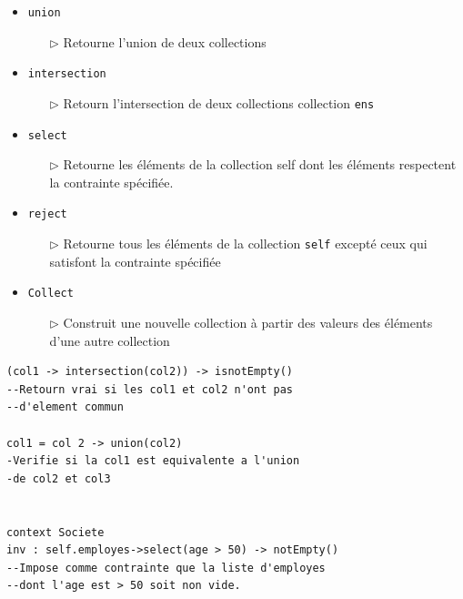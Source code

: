 \documentclass[16pt]{report}
\begin{document}
\begin{multicols*}{2}
  \begin{itemize}
            \item \textcolor{myb}{\texttt{union}}    
            \begin{itemize}
                \item[$\rhd$] Retourne l'union de deux collections 
            \end{itemize}
        \item \textcolor{myb}{\texttt{intersection}} 
            \begin{itemize}
                \item[$\rhd$] Retourn l'intersection de deux collections 
                    collection \texttt{ens}  
            \end{itemize}
        \item \textcolor{myb}{\texttt{select}}  
            \begin{itemize}
                \item[$\rhd$] Retourne les éléments de la collection self dont les éléments respectent la contrainte 
                    spécifiée. 
            \end{itemize}
        \item \textcolor{myb}{\texttt{reject}}  
            \begin{itemize}
                \item[$\rhd$] Retourne tous les éléments de la collection \texttt{self} excepté ceux qui 
                    satisfont la contrainte spécifiée
            \end{itemize}
        \item \textcolor{myb}{\texttt{Collect}}  
            \begin{itemize}
                \item[$\rhd$] Construit une nouvelle collection à partir des valeurs des éléments d'une autre 
                    collection
            \end{itemize}

        \end{itemize}       



\begin{lstlisting}
(col1 -> intersection(col2)) -> isnotEmpty() 
--Retourn vrai si les col1 et col2 n'ont pas 
--d'element commun 

col1 = col 2 -> union(col2)  
-Verifie si la col1 est equivalente a l'union 
-de col2 et col3 


context Societe 
inv : self.employes->select(age > 50) -> notEmpty() 
--Impose comme contrainte que la liste d'employes 
--dont l'age est > 50 soit non vide. 


\end{lstlisting}
\end{multicols*}
\end{document}
